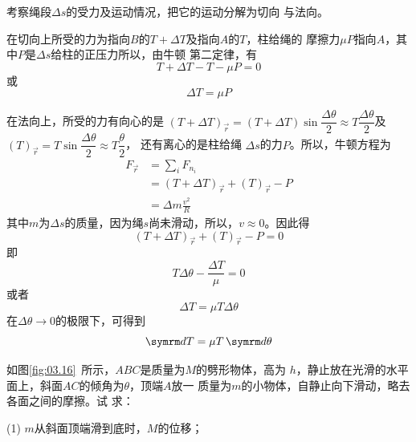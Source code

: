 \solution 考察绳段$ \Delta s $的受力及运动情况，把它的运动分解为切向
与法向。

在切向上所受的力为指向$ B $的$ T+\Delta T $及指向$ A $的$ T $，柱给绳的
摩擦力$ \mu P $指向$ A $，其中$ P $是$ \Delta s $给柱的正压力所以，由牛顿
第二定律，有
\begin{equation*}
    T + \Delta T - T - \mu P = 0
\end{equation*}
或\vspace{-1.56em}
\begin{equation*}
    \Delta T = \mu P
\end{equation*}

在法向上，所受的力有向心的是
$\left( T + \Delta T \right) _ \vec{r} = \left( T + \Delta T \right) \sin \dfrac{ \Delta \theta }{ 2 } \approx T \dfrac { \Delta \theta }{2}$及$ \left(T\right)_{\vec{r}} = T \sin \dfrac { \Delta \theta } { 2 } \approx T \dfrac { \theta } { 2 }$，
还有离心的是柱给绳
$ \Delta s $的力$ P $。所以，牛顿方程为
\begin{align*}
    F _ { \vec{r} } &= \sum _ i  F _ { n _ { i } } \\
    &= \left( T + \Delta T \right)_{\vec{r}} + \left( T \right)_{\vec{r}} - P \\
    &= \Delta m \frac { v ^ { 2 } } { R }
\end{align*}
其中$ m $为$ \Delta s $的质量，因为绳$ s $尚未滑动，所以，$  v \approx 0 $。因此得
\begin{equation*}
    \left( T + \Delta T \right) _{\vec{ r }} + \left( T \right) _{\vec{ r }} - P = 0
\end{equation*}
即\vspace{-1.56em}
\begin{equation*}
    T \Delta \theta - \frac { \Delta T } { \mu } = 0
\end{equation*}
或者\vspace{-1.56em}
\begin{equation*}
    \Delta T = \mu T \Delta \theta
\end{equation*}
在$ \Delta \theta \rightarrow 0 $的极限下，可得到
\begin{equation*}
    \dif T = \mu T \dif \theta
\end{equation*}

\example 如图\ref{fig:03.16}~所示，$ ABC $是质量为$ M $的劈形物体，高为
$ h $，静止放在光滑的水平面上，斜面$ AC $的倾角为$\theta $，顶端$ A $放一
质量为$ m $的小物体，自静止向下滑动，略去各面之间的摩擦。试
求：

(1) $ m $从斜面顶端滑到底时，$ M $的位移；

